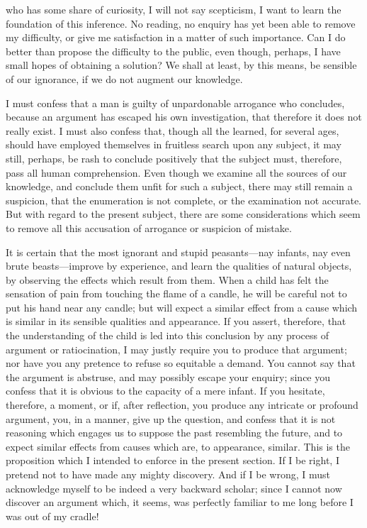 \documentclass[]{article}
\begin{document}
\begin{sectionbody}
who has some share of curiosity, I will not say scepticism, I want to learn the foundation of this inference. No reading, no enquiry has yet been able to remove my difficulty, or give me satisfaction in a matter of such importance. Can I do better than propose the difficulty to the public, even though, perhaps, I have small hopes of obtaining a solution? We shall at least, by this means, be sensible of our ignorance, if we do not augment our knowledge.

\humeparagraph  I must confess that a man is guilty of unpardonable arrogance who concludes, because an argument has escaped his own investigation, that therefore it does not really exist. I must also confess that, though all the learned, for several ages, should have employed themselves in fruitless search upon any subject, it may still, perhaps, be rash to conclude positively that the subject must, therefore, pass all human comprehension. Even though we examine all the sources of our knowledge, and conclude them unfit for such a subject, there may still remain a suspicion, that the enumeration is not complete, or the examination not accurate. But with regard to the present subject, there are some considerations which seem to remove all this accusation of arrogance or suspicion of mistake.

\humeparagraph  It is certain that the most ignorant and stupid peasants---nay infants, nay even brute beasts---improve by experience, and learn the qualities of natural objects, by observing the effects which result from them. When a child has felt the sensation of pain from touching the flame of a candle, he will be careful not to put his hand near any candle; but will expect a similar effect from a cause which is similar in its sensible qualities and appearance. If you assert, therefore, that the understanding of the child is led into this conclusion by any process of argument or ratiocination, I may justly require you to produce that argument; nor have you any pretence to refuse so equitable a demand. You cannot say that the argument is abstruse, and may possibly escape your enquiry; since you confess that it is obvious to the capacity of a mere infant. If you hesitate, therefore, a moment, or if, after reflection, you produce any intricate or profound argument, you, in a manner, give up the question, and confess that it is not reasoning which engages us to suppose the past resembling the future, and to expect similar effects from causes which are, to appearance, similar. This is the proposition which I intended to enforce in the present section. If I be right, I pretend not to have made any mighty discovery. And if I be wrong, I must acknowledge myself to be indeed a very backward scholar; since I cannot now discover an argument which, it seems, was perfectly familiar to me long before I was out of my cradle!

\end{sectionbody}
\end{document}
